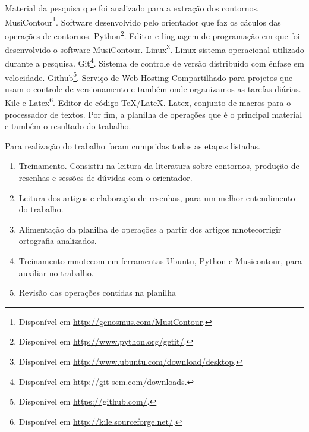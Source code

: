 \documentclass[11pt]{article}
\begin{document}
Material da pesquisa que foi analizado para a extração dos contornos.
MusiContour\footnote{Disponível em
  \url{http://genosmus.com/MusiContour}.}. Software desenvolvido pelo
orientador que faz os cáculos das operações de contornos.
Python\footnote{Disponível em
  \url{http://www.python.org/getit/}.}. Editor e linguagem de
programação em que foi desenvolvido o software MusiContour.
Linux\footnote{Disponível em
  \url{http://www.ubuntu.com/download/desktop}.}. Linux sistema
operacional utilizado durante a pesquisa.  Git\footnote{Disponível em
  \url{http://git-scm.com/downloads}.}. Sistema de controle de versão
distribuído com ênfase em velocidade.  Github\footnote{Disponível em
  \url{https://github.com/}.}. Serviço de Web Hosting Compartilhado
para projetos que usam o controle de versionamento e também onde
organizamos as tarefas diárias.  Kile e Latex\footnote{Disponível em
  \url{http://kile.sourceforge.net/}.}. Editor de código
TeX/LateX. Latex, conjunto de macros para o processador de textos.
Por fim, a planilha de operações que é o principal material e também o
resultado do trabalho.

Para realização do trabalho foram cumpridas todas as etapas listadas.

\begin{enumerate}
\item Treinamento. Consistiu na leitura da literatura sobre
  contornos, produção de resenhas e sessões de dúvidas com o
  orientador.
\item Leitura dos artigos e elaboração de resenhas, para um melhor
  entendimento do trabalho.
\item Alimentação da planilha de operações a partir dos artigos
  mnote{corrigir ortografia}
  analizados.
\item Treinamento
  mnote{com}
  em ferramentas Ubuntu, Python e Musicontour, para
  auxiliar no trabalho.
\item Revisão das operações contidas na planilha
\end{enumerate}
\end{document}
